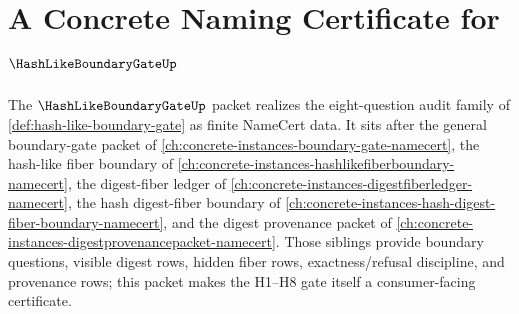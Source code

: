 \chapter{A Concrete Naming Certificate for $\HashLikeBoundaryGateUp$}
\label{ch:concrete-instances-hashlikeboundarygate-namecert}

The $\HashLikeBoundaryGateUp$ packet realizes the eight-question audit family of \autoref{def:hash-like-boundary-gate} as finite NameCert data. It sits after the general boundary-gate packet of \autoref{ch:concrete-instances-boundary-gate-namecert}, the hash-like fiber boundary of \autoref{ch:concrete-instances-hashlikefiberboundary-namecert}, the digest-fiber ledger of \autoref{ch:concrete-instances-digestfiberledger-namecert}, the hash digest-fiber boundary of \autoref{ch:concrete-instances-hash-digest-fiber-boundary-namecert}, and the digest provenance packet of \autoref{ch:concrete-instances-digestprovenancepacket-namecert}. Those siblings provide boundary questions, visible digest rows, hidden fiber rows, exactness/refusal discipline, and provenance rows; this packet makes the H1--H8 gate itself a consumer-facing certificate.


